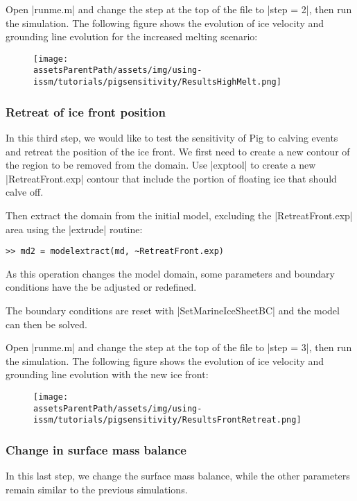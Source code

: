 Open \lstinlinebg|runme.m| and change the step at the top of the file to \lstinlinebg|step = 2|, then run the simulation. The following figure shows the evolution of ice velocity and grounding line evolution for the increased melting scenario:
\begin{figure}[H]
	\begin{center}
		\texttt{[image: \\assetsParentPath/assets/img/using-issm/tutorials/pigsensitivity/ResultsHighMelt.png]}
	\end{center}
\end{figure}
\subsubsection{Retreat of ice front position}%
In this third step, we would like to test the sensitivity of Pig to calving events and retreat the position of the ice front. We first need to create a new contour of the region to be removed from the domain. Use \lstinlinebg|exptool| to create a new \lstinlinebg|RetreatFront.exp| contour that include the portion of floating ice that should calve off.

Then extract the domain from the initial model, excluding the \lstinlinebg|RetreatFront.exp| area using the \lstinlinebg|extrude| routine:
\begin{lstlisting}
>> md2 = modelextract(md, ~RetreatFront.exp)
\end{lstlisting}

As this operation changes the model domain, some parameters and boundary conditions have the be adjusted or redefined.

The boundary conditions are reset with \lstinlinebg|SetMarineIceSheetBC| and the model can then be solved.

Open \lstinlinebg|runme.m| and change the step at the top of the file to \lstinlinebg|step = 3|, then run the simulation. The following figure shows the evolution of ice velocity and grounding line evolution with the new ice front:
\begin{figure}[H]
	\begin{center}
		\texttt{[image: \\assetsParentPath/assets/img/using-issm/tutorials/pigsensitivity/ResultsFrontRetreat.png]}
	\end{center}
\end{figure}
\subsubsection{Change in surface mass balance}%
In this last step, we change the surface mass balance, while the other parameters remain similar to the previous simulations.

